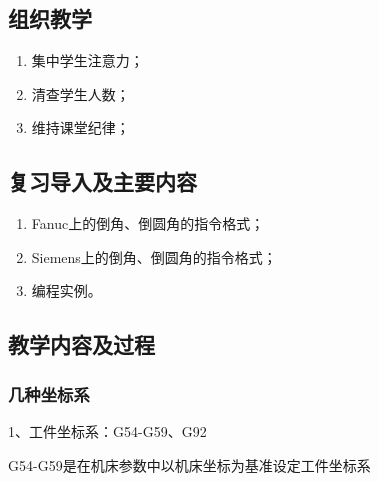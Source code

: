 \jxhj{%
	}

\makeshouye %

\subsection{组织教学}
\begin{enumerate}[\hspace{2em}1、]
	\item 集中学生注意力；
	\item 清查学生人数；
	\item 维持课堂纪律；
\end{enumerate}

\subsection{复习导入及主要内容}
\begin{enumerate}[1、]
\item Fanuc上的倒角、倒圆角的指令格式；
\item Siemens上的倒角、倒圆角的指令格式；
\item 编程实例。
\end{enumerate}

\subsection{教学内容及过程}
\subsubsection{几种坐标系}
	1、工件坐标系：G54-G59、G92
	
	G54-G59是在机床参数中以机床坐标为基准设定工件坐标系


